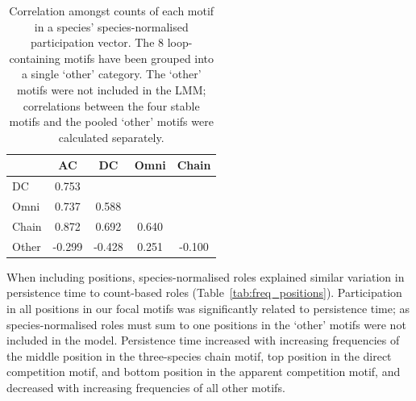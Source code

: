 \documentclass[12pt]{article}
\begin{document}
\begin{spacing}{2.0}
		\begin{table}[hb!]
    		\caption{Correlation amongst counts of each motif in a species' species-normalised participation vector. The 8 loop-containing motifs have been grouped into a single `other' category. The `other' motifs were not included in the LMM; correlations between the four stable motifs and the pooled `other' motifs were calculated separately.}
    		\label{tab:freq_correlations}
    		\begin{tabular}{l | c c c c}
    			& AC & DC & Omni & Chain \\
    		\hline
    		DC    &  0.753 &       & & \\         
    		Omni  &  0.737 &  0.588 &   & \\   
    		Chain &  0.872 &  0.692 & 0.640 & \\
    		Other & -0.299 & -0.428 & 0.251 & -0.100 \\
    		\hline
    		\end{tabular}
    		\end{table}

        
        When including positions, species-normalised roles explained similar variation in persistence time to count-based roles (Table~\ref{tab:freq_positions}).
        Participation in all positions in our focal motifs was significantly related to persistence time; as species-normalised roles must sum to one positions in the `other' motifs were not included in the model.
        Persistence time increased with increasing frequencies of the middle position in the three-species chain motif, top position in the direct competition motif, and bottom position in the apparent competition motif, and decreased with increasing frequencies of all other motifs.
        


\end{spacing}
\end{document}
